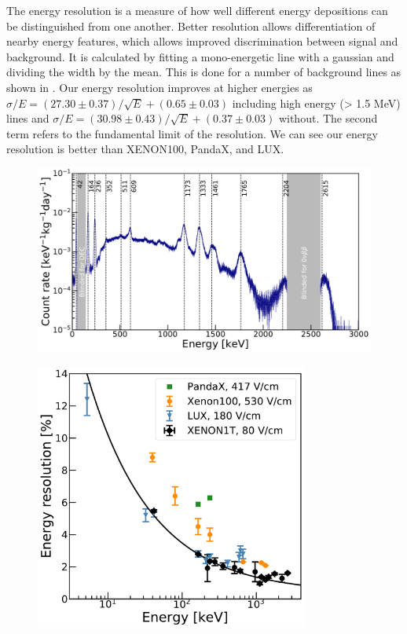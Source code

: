 The energy resolution is a measure of how well different energy depositions can be distinguished from one another.  Better resolution
allows differentiation of nearby energy features, which allows improved discrimination between signal and background.  It is calculated
by fitting a mono-energetic \gammaray line with a gaussian and dividing the width by the mean.  This is done for a number of background
lines as shown in .  Our energy resolution improves at higher energies
as $\sigma / E = (27.30 \pm 0.37) / \sqrt{E} + (0.65 \pm 0.03)$ including high energy (> 1.5 MeV) lines and
$\sigma / E = (30.98 \pm 0.43) / \sqrt{E} + (0.37 \pm 0.03)$ without.  The second term refers to the fundamental limit of the
resolution.  We can see our energy resolution is better than XENON100, PandaX, and LUX.

\begin{figure}
\centering
\includegraphics[width=\textwidth]{EnergySpectrum}
\label{fig:calibrations_photon_charge_efficiences_ces}
\end{figure}

\begin{figure}
\centering
\includegraphics[width=0.8\textwidth]{EnergyResolution}
\label{fig:calibrations_photon_charge_efficiences_ces_resolution}
\end{figure}



